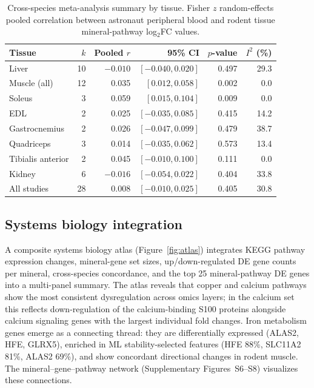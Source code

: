 \documentclass[11pt,a4paper]{article}
\begin{document}
\begin{table}[H]
\centering
\caption{Cross-species meta-analysis summary by tissue. Fisher $z$ random-effects pooled correlation between astronaut peripheral blood and rodent tissue mineral-pathway log$_2$FC values.}
\label{tab:meta_summary}
\begin{tabular}{lrrrrr}
\toprule
\textbf{Tissue} & \textbf{$k$} & \textbf{Pooled $r$} & \textbf{95\% CI} & \textbf{$p$-value} & \textbf{$I^2$ (\%)} \\
\midrule
Liver & 10 & $-0.010$ & $[-0.040, 0.020]$ & 0.497 & 29.3 \\
Muscle (all) & 12 & 0.035 & $[0.012, 0.058]$ & 0.002 & 0.0 \\
\quad Soleus & 3 & 0.059 & $[0.015, 0.104]$ & 0.009 & 0.0 \\
\quad EDL & 2 & 0.025 & $[-0.035, 0.085]$ & 0.415 & 14.2 \\
\quad Gastrocnemius & 2 & 0.026 & $[-0.047, 0.099]$ & 0.479 & 38.7 \\
\quad Quadriceps & 3 & 0.014 & $[-0.035, 0.062]$ & 0.573 & 13.4 \\
\quad Tibialis anterior & 2 & 0.045 & $[-0.010, 0.100]$ & 0.111 & 0.0 \\
Kidney & 6 & $-0.016$ & $[-0.054, 0.022]$ & 0.404 & 33.8 \\
All studies & 28 & 0.008 & $[-0.010, 0.025]$ & 0.405 & 30.8 \\
\bottomrule
\end{tabular}
\end{table}

\subsection{Systems biology integration}

A composite systems biology atlas (Figure~\ref{fig:atlas}) integrates KEGG pathway expression changes, mineral-gene set sizes, up/down-regulated DE gene counts per mineral, cross-species concordance, and the top 25 mineral-pathway DE genes into a multi-panel summary. The atlas reveals that copper and calcium pathways show the most consistent dysregulation across omics layers; in the calcium set this reflects down-regulation of the calcium-binding S100 proteins alongside calcium signaling genes with the largest individual fold changes. Iron metabolism genes emerge as a connecting thread: they are differentially expressed (ALAS2, HFE, GLRX5), enriched in ML stability-selected features (HFE 88\%, SLC11A2 81\%, ALAS2 69\%), and show concordant directional changes in rodent muscle. The mineral--gene--pathway network (Supplementary Figures~S6--S8) visualizes these connections.
\end{document}
